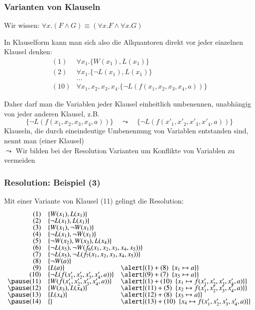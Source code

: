 \documentclass[aspectratio=1610,onlymath]{beamer}
\begin{document}
\begin{frame}\frametitle{Varianten von Klauseln}

Wir wissen: $\forall x.(F\wedge G)\equiv (\forall x.F\wedge \forall x.G)$ 
\bigskip

In Klauselform kann man sich also die Allquantoren direkt vor jeder einzelnen Klausel denken:
{\small%
\[\begin{array}{rl}
(1) & \forall x_1.\{W(x_1), L(x_1)\}\\[-0.5ex]
(2) & \forall x_1.\{\neg L(x_1), L(x_1)\}\\[-0.5ex]
& \ldots\\
(10) & \forall x_1,x_2,x_3,x_4.\{\neg L(f(x_1,x_2,x_3,x_4,a))\}
\end{array}
\]}\vspace{-1.5ex}\pause

Daher darf man die Variablen jeder Klausel einheitlich umbenennen, unabhängig von jeder anderen Klausel, z.B.
\[ \{\neg L(f(x_1,x_2,x_3,x_4,a))\} \quad\leadsto\quad \{\neg L(f(x'_1,x'_2,x'_3,x'_4,a))\} \]
Klauseln, die durch eineindeutige Umbenennung von Variablen entstanden sind, nennt man  (einer Klausel)\\[0.5ex]
\alert{$\leadsto$ Wir bilden bei der Resolution Varianten um Konflikte von Variablen zu vermeiden}

\end{frame}

\begin{frame}[t]\frametitle{Resolution: Beispiel (3)}

Mit einer Variante von Klausel (11) gelingt die Resolution:
%
{\small%
\[\begin{array}{rll}
(1) & \{W(x_1), L(x_1)\}\\[-0.5ex]
(2) & \{\neg L(x_1), L(x_1)\}\\[-0.5ex]
(3) & \{W(x_1), \neg W(x_1)\}\\[-0.5ex]
(4) & \{\neg L(x_1), \neg W(x_1)\}\\[-0.5ex]
(5) & \{\neg W(x_2), W(x_3), L(x_4)\}\\[-0.5ex]
(6) & \{\neg L(x_5),\ghost{$\neg W(f_6(x_1,x_2,x_3,x_4,x_5))\}$}\\[-0.5ex]
(7) & \{\neg L(x_5),\ghost{$\neg L(f_7(x_1,x_2,x_3,x_4,x_5))\}$} \\[-0.5ex]
(8) & \{\neg W(a)\}\\[-0.5ex]
(9) & \{L(a)\} & \alert{(1)+(8)~~ \{x_1\mapsto a\}}\\[-0.5ex]
(10) & \{\neg L(f(x'_1,x'_2,x'_3,x'_4,a))\} & \alert{(9)+(7)~~ \{x_5\mapsto a\}}\\[-0.5ex]\pause
(11) & \{W(f(x'_1,x'_2,x'_3,x'_4,a))\} & \alert{(1)+(10)~~ \{x_1\mapsto f(x'_1,x'_2,x'_3,x'_4,a)\}}\\[-0.5ex]\pause
(12) & \{W(x_3), L(x_4)\} & \alert{(11)+(5)~~ \{x_2\mapsto f(x'_1,x'_2,x'_3,x'_4,a)\}}\\[-0.5ex]\pause
(13) & \{L(x_4)\} & \alert{(12)+(8)~~ \{x_3\mapsto a\}}\\[-0.5ex]\pause
(14) & \{\} & \alert{(13)+(10)~~ \{x_4\mapsto f(x'_1,x'_2,x'_3,x'_4,a)\}}
\end{array}
\]}

\end{frame}
\end{document}
